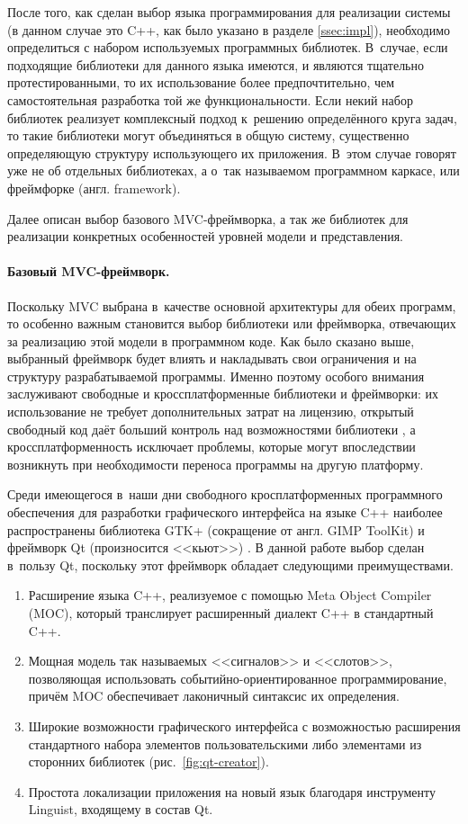 \documentclass[a4paper, 14pt, titlepage]{extarticle}
\newcommand{\eng}[1]{\foreignlanguage{english}{#1}}
\let\oldparagraph\paragraph
\renewcommand{\paragraph}[1]{\oldparagraph{\indent #1}}
\begin{document}
  После того, как сделан выбор языка программирования для реализации системы (в данном случае это
  C++, как было указано в разделе \ref{ssec:impl}), необходимо определиться с набором используемых
  программных библиотек. В~случае, если подходящие библиотеки для данного языка имеются, и являются тщательно
  протестированными, то их использование более предпочтительно, чем самостоятельная разработка той
  же функциональности. Если некий набор библиотек реализует комплексный подход к~решению
  определённого круга задач, то такие библиотеки могут объединяться в общую систему, существенно
  определяющую структуру использующего их приложения. В~этом случае говорят уже не об отдельных
  библиотеках, а о~так называемом программном каркасе, или фреймфорке (англ. \eng{framework}).

  Далее описан выбор базового MVC-фреймворка, а так же библиотек для реализации
  конкретных особенностей уровней модели и представления.

  \paragraph{Базовый MVC-фреймворк.}
  Поскольку MVC выбрана в~качестве основной архитектуры для обеих программ, то особенно важным
  становится выбор библиотеки или фреймворка, отвечающих за реализацию этой модели в программном
  коде. Как было сказано выше, выбранный фреймворк будет влиять и накладывать свои ограничения и на
  структуру разрабатываемой программы. Именно поэтому особого внимания заслуживают свободные и
  кроссплатформенные библиотеки и фреймворки: их использование не требует дополнительных затрат на
  лицензию, открытый свободный код даёт больший контроль над возможностями библиотеки \cite{open-source},
  а кроссплатформенность исключает проблемы, которые могут впоследствии возникнуть при необходимости
  переноса программы на другую платформу.

  Среди имеющегося в~наши дни свободного кросплатформенных программного обеспечения для разработки
  графического интерфейса на языке C++ наиболее распространены библиотека GTK+ (сокращение от англ.
  \eng{GIMP ToolKit}) \cite{gtk} и фреймворк Qt (произносится <<кьют>>) \cite{qt}. В данной работе
  выбор сделан в~пользу Qt, поскольку этот фреймворк обладает следующими преимуществами.
  \begin{enumerate}
    \item Расширение языка C++, реализуемое с помощью \eng{Meta Object Compiler (MOC)}, который
      транслирует расширенный диалект C++ в стандартный C++.
    \item Мощная модель так называемых <<сигналов>> и <<слотов>>, позволяющая использовать
      событийно-ориентированное программирование, причём MOC обеспечивает лаконичный синтаксис их определения.
    \item Широкие возможности графического интерфейса с возможностью расширения стандартного набора
      элементов пользовательскими либо элементами из сторонних библиотек (рис.~\ref{fig:qt-creator}).
    \item Простота локализации приложения на новый язык благодаря инструменту \eng{Linguist},
      входящему в состав Qt.
  \end{enumerate}
\end{document}
